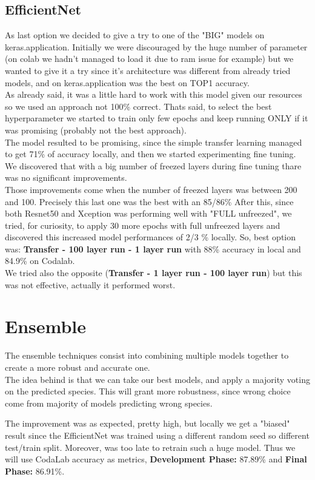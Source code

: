 \documentclass[11pt]{article}
\begin{document}
\subsection{EfficientNet}
As last option we decided to give a try to one of the "BIG" models on keras.application.
Initially we were discouraged by the huge number of parameter (on colab we hadn't managed to load it due to ram issue for example)
but we wanted to give it a try since it's architecture was different from already tried models, and on keras.application was the best on TOP1 accuracy.\\
As already said, it was a little hard to work with this model given our resources so we used an approach not 100\% correct.
Thats said, to select the best hyperparameter we started to train only few epochs and keep running ONLY if it was promising (probably not the best approach).\\
The model resulted to be promising, since the simple transfer learning managed to get 71\% of accuracy locally, and then we started experimenting fine tuning.
We discovered that with a big number of freezed layers during fine tuning thare was no significant improvements.\\
Those improvements come when the number of freezed layers was between 200 and 100. Precisely this last one was the best with an 85/86\% 
After this, since both Resnet50 and Xception was performing well with "FULL unfreezed", we tried, for curiosity, to apply 30 more epochs with full unfreezed layers and discovered this increased model performances of 2/3 \% locally.
So, best option was: \textbf{Transfer - 100 layer run - 1 layer run} with 88\% accuracy in local and 84.9\% on Codalab.\\
We tried also the opposite (\textbf{Transfer - 1 layer run - 100 layer run}) but this was not effective, actually it performed worst.



\section{Ensemble}
The ensemble techniques consist into combining multiple models together to create a more robust and accurate one.\\
The idea behind is that we can take our best models, and apply a majority voting on the predicted species.
This will grant more robustness, since wrong choice come from majority of models predicting wrong species.

The improvement was as expected, pretty high, but locally we get a "biased" result since the EfficientNet was trained using a different random seed so different test/train split. Moreover, was too late to retrain such a huge model.
Thus we will use CodaLab accuracy as metrics,
\textbf{Development Phase:} 87.89\% and \textbf{Final Phase:} 86.91\%.
\end{document}
